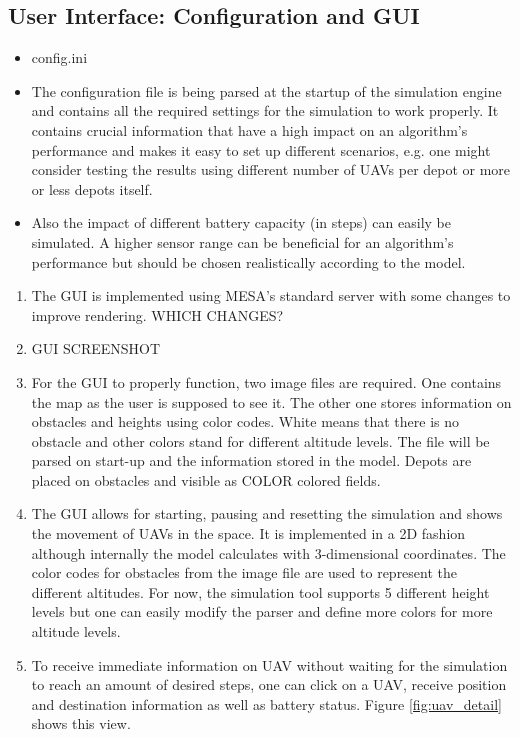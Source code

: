 \subsection{User Interface: Configuration and GUI}
\begin{itemize}
	\item config.ini
	\item The configuration file is being parsed at the startup of the simulation engine and contains all the required settings for the simulation to work properly. It contains crucial information that have a high impact on an algorithm's performance and makes it easy to set up different scenarios, e.g. one might consider testing the results using different number of UAVs per depot or more or less depots itself.
	\item Also the impact of different battery capacity (in steps) can easily be simulated. A higher sensor range can be beneficial for an algorithm's performance but should be chosen realistically according to the model.
\end{itemize}
\begin{enumerate}
	\item The GUI is implemented using MESA's standard server with some changes to improve rendering. WHICH CHANGES?
	\item GUI SCREENSHOT
	\item For the GUI to properly function, two image files are required. One contains the map as the user is supposed to see it. The other one stores information on obstacles and heights using color codes. White means that there is no obstacle and other colors stand for different altitude levels. The file will be parsed on start-up and the information stored in the model.  Depots are placed on obstacles and visible as COLOR colored fields.
	\item The GUI allows for starting, pausing and resetting the simulation and shows the movement of UAVs in the space. It is implemented in a 2D fashion although internally the model calculates with 3-dimensional coordinates. The color codes for obstacles from the image file are used to represent the different altitudes. For now, the simulation tool supports 5 different height levels but one can easily modify the parser and define more colors for more altitude levels.
	\item To receive immediate information on UAV without waiting for the simulation to reach an amount of desired steps, one can click on a UAV, receive position and destination information as well as battery status. Figure \ref{fig:uav_detail} shows this view.


\end{enumerate}


